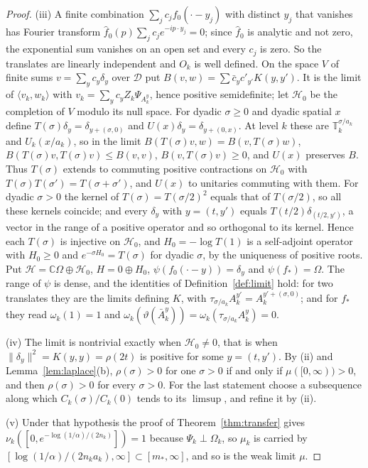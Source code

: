 \documentclass[aps,prd,twocolumn,superscriptaddress,nofootinbib,longbibliography,floatfix,amsmath,amssymb,10pt]{revtex4-2}
\theoremstyle{definition}
\theoremstyle{remark}
\newcommand{\C}{\mathbb{C}}
\newcommand{\ip}[2]{\langle #1,#2\rangle}
\begin{document}
\begin{proof}
(iii) A finite combination $\sum_jc_jf_0(\cdot-y_j)$ with distinct $y_j$ that
vanishes has Fourier transform $\hat f_0(p)\sum_jc_je^{-ip\cdot y_j}=0$; since
$\hat f_0$ is analytic and not zero, the exponential sum vanishes on an open
set and every $c_j$ is zero. So the translates are linearly independent and
$O_k$ is well defined. On the space $V$ of finite sums $v=\sum_yc_y\delta_y$
over $\mathcal D$ put $B(v,w)=\sum\bar c_yc'_{y'}K(y,y')$. It is the limit of
$\ip{v_k}{w_k}$ with $v_k=\sum_yc_yZ_k\Psi_{A^y_k}$, hence positive
semidefinite; let $\mathcal H_0$ be the completion of $V$ modulo its null
space. For dyadic $\sigma\ge0$ and dyadic spatial $x$ define
$T(\sigma)\delta_y=\delta_{y+(\sigma,0)}$ and $U(x)\delta_y=\delta_{y+(0,x)}$.
At level $k$ these are $\mathbb T_k^{\sigma/a_k}$ and $U_k(x/a_k)$, so in the
limit $B(T(\sigma)v,w)=B(v,T(\sigma)w)$, $B(T(\sigma)v,T(\sigma)v)\le B(v,v)$,
$B(v,T(\sigma)v)\ge0$, and $U(x)$ preserves $B$. Thus $T(\sigma)$ extends to
commuting positive contractions on $\mathcal H_0$ with
$T(\sigma)T(\sigma')=T(\sigma+\sigma')$, and $U(x)$ to unitaries commuting with
them. For dyadic $\sigma>0$ the kernel of $T(\sigma)=T(\sigma/2)^2$ equals that
of $T(\sigma/2)$, so all these kernels coincide; and every $\delta_y$ with
$y=(t,y')$ equals $T(t/2)\delta_{(t/2,y')}$, a vector in the range of a
positive operator and so orthogonal to its kernel. Hence each $T(\sigma)$ is
injective on $\mathcal H_0$, and $H_0=-\log T(1)$ is a self-adjoint operator
with $H_0\ge0$ and $e^{-\sigma H_0}=T(\sigma)$ for dyadic $\sigma$, by the
uniqueness of positive roots. Put $\mathcal H=\C\Omega\oplus\mathcal H_0$,
$H=0\oplus H_0$, $\psi(f_0(\cdot-y))=\delta_y$ and $\psi(f_*)=\Omega$. The range
of $\psi$ is dense, and the identities of Definition~\ref{def:limit} hold: for
two translates they are the limits defining $K$, with $\tau_{\sigma/a_k}A^{y'}_k=
A^{y'+(\sigma,0)}_k$; and for $f_*$ they read $\omega_k(1)=1$ and
$\omega_k(\vartheta(\bar A^y_k))=\omega_k(\tau_{\sigma/a_k}A^y_k)=0$.

(iv) The limit is nontrivial exactly when $\mathcal H_0\ne0$, that is when
$\|\delta_y\|^2=K(y,y)=\rho(2t)$ is positive for some $y=(t,y')$. By (ii) and Lemma~\ref{lem:laplace}(b),
$\rho(\sigma)>0$ for one $\sigma>0$ if and only if $\mu([0,\infty))>0$, and
then $\rho(\sigma)>0$ for every $\sigma>0$. For the last statement choose a
subsequence along which $C_k(\sigma)/C_k(0)$ tends to its $\limsup$, and refine
it by (ii).

(v) Under that hypothesis the proof of Theorem~\ref{thm:transfer} gives
$\nu_k([0,e^{-\log(1/\alpha)/(2n_k)}])=1$ because $\Psi_k\perp\Omega_k$, so
$\mu_k$ is carried by $[\log(1/\alpha)/(2n_ka_k),\infty]\subset[m_*,\infty]$,
and so is the weak limit $\mu$.
\end{proof}
\end{document}
